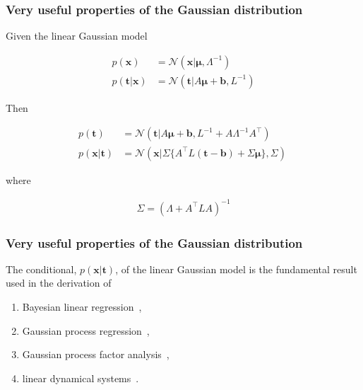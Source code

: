 \documentclass{beamer}
\begin{document}
\begin{frame}
    \frametitle{Very useful properties of the Gaussian distribution \citep{bishop06}}

	\small
	\begin{theorem}

		Given the linear Gaussian model

		\begin{align*}
			p(\mathbf{x})&=\mathcal{N}(\mathbf{x}|\boldsymbol{\mu},\Lambda^{-1})\\
			p(\mathbf{t}|\mathbf{x})&=\mathcal{N}(\mathbf{t}|A\boldsymbol{\mu}+\mathbf{b},L^{-1})
		\end{align*}

		Then

		\begin{align}
            p(\mathbf{t})&=\mathcal{N}(\mathbf{t}|A\boldsymbol{\mu}+\mathbf{b},L^{-1}+A\Lambda^{-1}A^\intercal)\label{eq:marginalLinearGaussianModel}\\
			p(\mathbf{x}|\mathbf{t})&=\mathcal{N}(\mathbf{x}|\Sigma\{A^\intercal L(\mathbf{t}-\mathbf{b})+\Sigma\boldsymbol{\mu}\},\Sigma)~\label{eq:conditionalLinearGaussianModel}
		\end{align}

		where

		\begin{align*}
			\Sigma=(\Lambda+A^\intercal LA)^{-1}
		\end{align*}

	\end{theorem}
	\normalsize
\end{frame}

\begin{frame}
    \frametitle{Very useful properties of the Gaussian distribution \citep{bishop06}}

	The conditional, $p(\mathbf{x}|\mathbf{t})$, of the linear Gaussian model is the fundamental result used in the derivation of

	\begin{enumerate}

		\item Bayesian linear regression~\citep{bishop06},

		\item Gaussian process regression~\citep{williamsAndRasmussen06},

		\item Gaussian process factor analysis~\citep{yuEtAl09},

		\item linear dynamical systems~\citep{durbinAndKoopman12}.

	\end{enumerate}

\end{frame}
\end{document}
